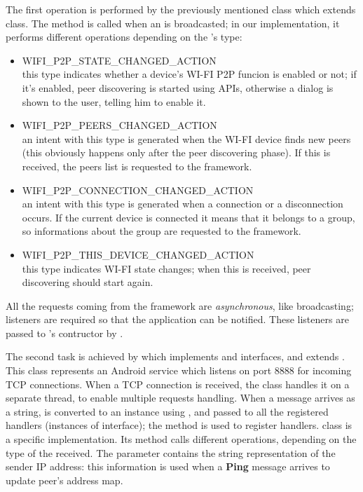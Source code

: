 	The first operation is performed by the previously mentioned  class which extends  class. The method  is called when an  is broadcasted; in our implementation, it performs different operations depending on the 's type:
	\begin{itemize}
		\item WIFI\_P2P\_STATE\_CHANGED\_ACTION \hfill \\
		this type indicates whether a device's WI-FI P2P funcion is enabled or not; if it's enabled, peer discovering is started using \direct APIs, otherwise a dialog is shown to the user, telling him to enable it.
		\item WIFI\_P2P\_PEERS\_CHANGED\_ACTION \hfill \\
		an intent with this type is generated when the WI-FI device finds new peers (this obviously happens only after the peer discovering phase). If this  is received, the peers list is requested to the \direct framework.
		\item WIFI\_P2P\_CONNECTION\_CHANGED\_ACTION \hfill \\
		an intent with this type is generated when a connection or a disconnection occurs. If the current device is connected it means that it belongs to a \direct group, so informations about the group are requested to the \direct framework.
		\item WIFI\_P2P\_THIS\_DEVICE\_CHANGED\_ACTION \hfill \\
		this type indicates WI-FI state changes; when this  is received, peer discovering should start again.
	\end{itemize}

All the requests coming from the \direct framework are \textit{asynchronous}, like  broadcasting; listeners are required so that the application can be notified. These listeners are passed to 's contructor by .
	
	The second task is achieved by  which implements  and  interfaces, and extends . This class represents an Android service which listens on port 8888 for incoming TCP connections. When a TCP connection is received, the class handles it on a separate thread, to enable multiple requests handling. When a message arrives as a string, is converted to an  instance using , and passed to all the registered handlers (instances of  interface); the method  is used to register handlers.
	 class is a specific  implementation. Its method  calls different  operations, depending on the type of the received. The parameter  contains the string representation of the sender IP address: this information is used when a \textbf{Ping} message arrives to update peer's address map.
	\\
